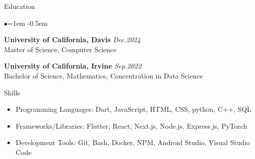 \documentclass{resume} %
\begin{document}
	
	
	\begin{rSection}{Education}
		
		\begin{list}{$\bullet$}{\leftmargin=1em} %
			\itemsep -0.5em \vspace{0em} %
			\item{
			{\bf University of California, Davis} \hfill\textit{Dec.2024} \\
			Master of Science, Computer Science \\
            \vspace{-0.5em}
		}

			\item{{\bf University of California, Irvine} \hfill\textit {Sep.2022} \\
				Bachelor of Science, Mathematics, Concentration in Data Science\\
				\vspace{-0.5em}\small
			}
			
		\end{list}
	\end{rSection}

    \begin{rSection}{Skills}
        \begin{itemize}
            \item Programming Languages: Dart, JavaScript, HTML, CSS, python, C++, SQL
            \item Frameworks/Libraries: Flutter, React, Next.js, Node.js, Express.js, PyTorch
            \item Development Tools: Git, Bash, Docker, NPM, Android Studio, Visual Studio Code
            
        \end{itemize}
	\end{rSection}
	
\end{document}
